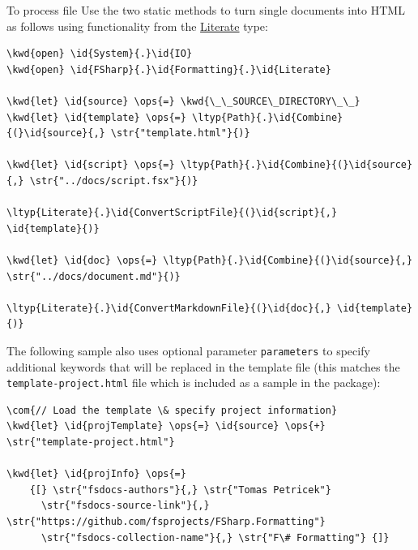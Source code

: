 \documentclass{article}
\newcommand{\id}[1]{\textcolor{black}{#1}}
\newcommand{\com}[1]{\textcolor{officegreen}{#1}}
\newcommand{\kwd}[1]{\textcolor{navy}{#1}}
\newcommand{\ops}[1]{\textcolor{purple}{#1}}
\newcommand{\str}[1]{\textcolor{olive}{#1}}
\begin{document}
To process file Use the two static methods to turn single documents into HTML
as follows using functionality from the \href{https://fsprojects.github.io/FSharp.Formatting/reference/fsharp-formatting-literate-literate.html}{Literate} type:
\begin{Verbatim}[commandchars=\\\{\}]
\kwd{open} \id{System}{.}\id{IO}
\kwd{open} \id{FSharp}{.}\id{Formatting}{.}\id{Literate}

\kwd{let} \id{source} \ops{=} \kwd{\_\_SOURCE\_DIRECTORY\_\_}
\kwd{let} \id{template} \ops{=} \ltyp{Path}{.}\id{Combine}{(}\id{source}{,} \str{"template.html"}{)}

\kwd{let} \id{script} \ops{=} \ltyp{Path}{.}\id{Combine}{(}\id{source}{,} \str{"../docs/script.fsx"}{)}

\ltyp{Literate}{.}\id{ConvertScriptFile}{(}\id{script}{,} \id{template}{)}

\kwd{let} \id{doc} \ops{=} \ltyp{Path}{.}\id{Combine}{(}\id{source}{,} \str{"../docs/document.md"}{)}

\ltyp{Literate}{.}\id{ConvertMarkdownFile}{(}\id{doc}{,} \id{template}{)}
\end{Verbatim}



The following sample also uses optional parameter \texttt{parameters} to specify additional
keywords that will be replaced in the template file (this matches the \texttt{template-project.html}
file which is included as a sample in the package):
\begin{Verbatim}[commandchars=\\\{\}]
\com{// Load the template \& specify project information}
\kwd{let} \id{projTemplate} \ops{=} \id{source} \ops{+} \str{"template-project.html"}

\kwd{let} \id{projInfo} \ops{=}
    {[} \str{"fsdocs-authors"}{,} \str{"Tomas Petricek"}
      \str{"fsdocs-source-link"}{,} \str{"https://github.com/fsprojects/FSharp.Formatting"}
      \str{"fsdocs-collection-name"}{,} \str{"F\# Formatting"} {]}
\end{Verbatim}
\end{document}
